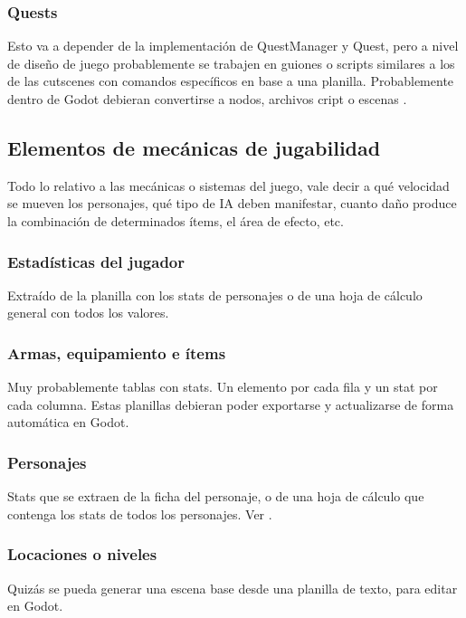 \subsubsection{Quests}\label{kit:quests}
Esto va a depender de la implementación de QuestManager y Quest, pero a nivel de diseño de juego probablemente se trabajen en guiones o scripts similares a los de las cutscenes con comandos específicos en base a una planilla. Probablemente dentro de Godot debieran convertirse a nodos, archivos cript o escenas .

\subsection{Elementos de mecánicas de jugabilidad}\label{kit:elementos-de-mecanicas}
Todo lo relativo a las mecánicas o sistemas del juego, vale decir a qué velocidad se mueven los personajes, qué tipo de IA deben manifestar, cuanto daño produce la combinación de determinados ítems, el área de efecto, etc.

\subsubsection{Estadísticas del jugador}\label{kit:estadisticas-del-jugador}
Extraído de la planilla con los stats de personajes o de una hoja de cálculo general con todos los valores.

\subsubsection{Armas, equipamiento e ítems}\label{kit:armas-equipamiento-items}
Muy probablemente tablas con stats. Un elemento por cada fila y un stat por cada columna. Estas planillas debieran poder exportarse y actualizarse de forma automática en Godot.

\subsubsection{Personajes}\label{kit:personajes}
Stats que se extraen de la ficha del personaje, o de una hoja de cálculo que contenga los stats de todos los personajes. Ver .

\subsubsection{Locaciones o niveles}\label{kit:locaciones-o-niveles}
Quizás se pueda generar una escena base desde una planilla de texto, para editar en Godot.

